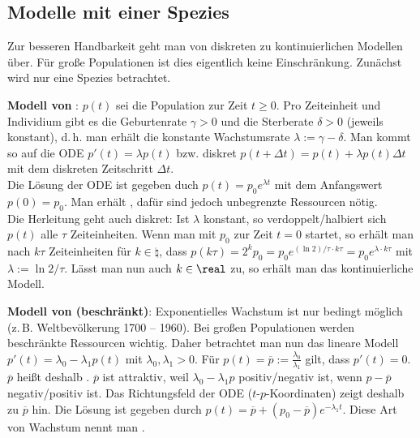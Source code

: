 \subsection{%
    Modelle mit einer Spezies%
}

Zur besseren Handbarkeit geht man von diskreten zu kontinuierlichen Modellen über.
Für große Populationen ist dies eigentlich keine Einschränkung.
Zunächst wird nur eine Spezies betrachtet.

\textbf{Modell von }:
$p(t)$ sei die Population zur Zeit $t \ge 0$.
Pro Zeiteinheit und Individium gibt es die Geburtenrate $\gamma > 0$ und die Sterberate
$\delta > 0$ (jeweils konstant), d.\,h. man erhält die konstante Wachstumsrate
$\lambda := \gamma - \delta$.
Man kommt so auf die ODE $p'(t) = \lambda p(t)$ bzw. diskret
$p(t + \Delta t) = p(t) + \lambda p(t) \Delta t$
mit dem diskreten Zeitschritt $\Delta t$.\\
Die Lösung der ODE ist gegeben duch $p(t) = p_0 e^{\lambda t}$ mit dem Anfangswert $p(0) = p_0$.
Man erhält , dafür sind jedoch unbegrenzte Ressourcen nötig.\\
Die Herleitung geht auch diskret:
Ist $\lambda$ konstant, so verdoppelt/halbiert sich $p(t)$ alle $\tau$ Zeiteinheiten.
Wenn man mit $p_0$ zur Zeit $t = 0$ startet, so erhält man nach $k\tau$ Zeiteinheiten
für $k \in \natural$, dass $p(k\tau) = 2^k p_0 = p_0 e^{(\ln 2)/\tau \cdot k\tau}
= p_0 e^{\lambda \cdot k\tau}$ mit $\lambda := \ln 2/\tau$.
Lässt man nun auch $k \in \real$ zu, so erhält man das kontinuierliche Modell.

\linie

\textbf{Modell von  (beschränkt)}:
Exponentielles Wachstum ist nur bedingt möglich (z.\,B. Weltbevölkerung 1700 -- 1960).
Bei großen Populationen werden beschränkte Ressourcen wichtig.
Daher betrachtet man nun das lineare Modell $p'(t) = \lambda_0 - \lambda_1 p(t)$
mit $\lambda_0, \lambda_1 > 0$.
Für $p(t) = \overline{p} := \frac{\lambda_0}{\lambda_1}$ gilt, dass $p'(t) = 0$.
$\overline{p}$ heißt deshalb .
$\overline{p}$ ist attraktiv, weil $\lambda_0 - \lambda_1 p$ positiv/negativ ist,
wenn $p - \overline{p}$ negativ/positiv ist.
Das Richtungsfeld der ODE ($t$-$p$-Koordinaten) zeigt deshalb zu $\overline{p}$ hin.
Die Lösung ist gegeben durch $p(t) = \overline{p} + (p_0 - \overline{p}) e^{-\lambda_1 t}$.
Diese Art von Wachstum nennt man .

\linie

